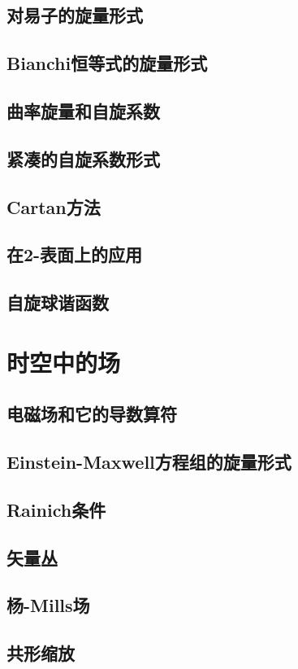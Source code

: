 \documentclass[utf8]{ctexbook}
\numberwithin{equation}{section}
\begin{document}
\section{对易子的旋量形式}
\section{Bianchi恒等式的旋量形式}
\section{曲率旋量和自旋系数}
\section{紧凑的自旋系数形式}
\section{Cartan方法}
\section{在2-表面上的应用}
\section{自旋球谐函数}
\chapter{时空中的场}
\section{电磁场和它的导数算符}
\section{Einstein-Maxwell方程组的旋量形式}
\section{Rainich条件}
\section{矢量丛}
\section{杨-Mills场}
\section{共形缩放}
\end{document}
